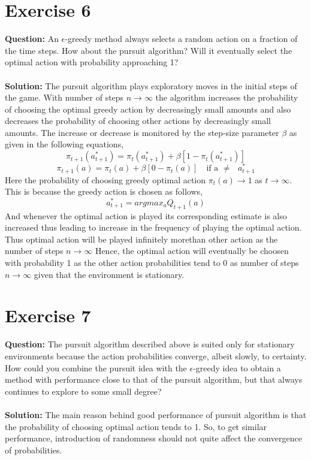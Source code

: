 \documentclass[a4paper,10pt]{report}
\begin{document}
\section{Exercise 6}
\textbf{Question:} 
An $\epsilon $-greedy method always selects a random action on a fraction of the time steps. How about the pursuit algorithm? Will it eventually select the optimal action with probability approaching 1?
\\\\
\textbf{Solution:} The pursuit algorithm plays exploratory moves in the initial steps of the game. With number of steps $n \rightarrow \infty$ the algorithm increases the probability of choosing the optimal greedy action by decreasingly small amounts and also decreases the probability of choosing other actions by decreasingly small amounts. The increase or decrease is monitored by the step-size parameter $\beta$ as given in the following equations,
\[\pi_{t+1}(a^{*}_{t+1}) = \pi_{t}(a^{*}_{t+1}) + \beta[1-\pi_{t}(a^{*}_{t+1})]\]
\[\pi_{t+1}(a) = \pi_{t}(a) + \beta[0-\pi_t(a)] \quad \text{if a $\neq$ $a^{*}_{t+1}$}\]
Here the probability of choosing greedy optimal action $\pi_{t}(a) \rightarrow 1$ as  $t \rightarrow \infty$. This is because the greedy action is chosen as follows,
\[a^{*}_{t+1} = argmax_{a} Q_{t+1}(a)\]
And whenever the optimal action is played its corresponding estimate is also increased thus leading to increase in the frequency of playing the optimal action. Thus optimal action will be played infinitely morethan other action as the number of steps $n \rightarrow \infty$
Hence, the optimal action will eventually be choosen with probability 1 as the other action probabilities tend to 0 as number of steps $n \rightarrow \infty$ given that the environment is stationary.

\section{Exercise 7}
\textbf{Question:}
The pursuit algorithm described above is suited only for stationary environments because the action probabilities converge, albeit slowly, to certainty. How could you combine the pursuit idea with the $\epsilon$-greedy idea to obtain a method with performance close to that of the pursuit algorithm, but that always continues to explore to some small degree?
\\\\
\textbf{Solution:}
The main reason behind good performance of pursuit algorithm is that the probability of choosing optimal action tends to 1. So, to get similar performance, introduction of randomness should not quite affect the convergence of probabilities.
\end{document}
